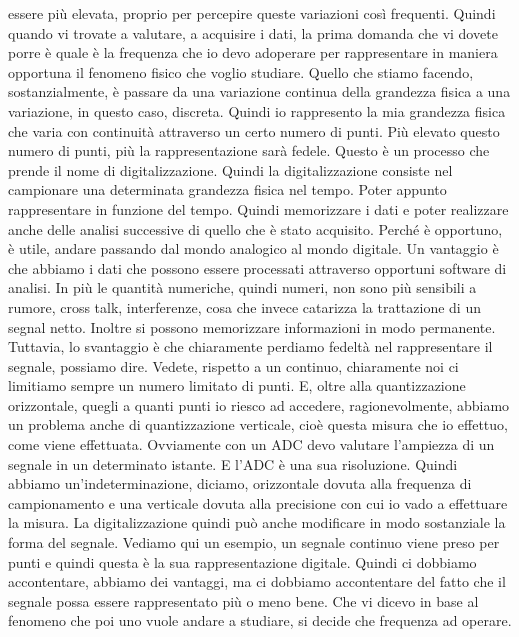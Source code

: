 essere più elevata, proprio per percepire queste variazioni così frequenti. Quindi quando vi trovate a valutare, a acquisire i dati, la prima domanda che vi dovete porre è quale è la frequenza che io devo adoperare per rappresentare in maniera opportuna il fenomeno fisico che voglio studiare. Quello che stiamo facendo, sostanzialmente, è passare da una variazione continua della grandezza fisica a una variazione, in questo caso, discreta. Quindi io rappresento la mia grandezza fisica che varia con continuità attraverso un certo numero di punti. Più elevato questo numero di punti, più la rappresentazione sarà fedele. Questo è un processo che prende il nome di digitalizzazione. Quindi la digitalizzazione consiste nel campionare una determinata grandezza fisica nel tempo. Poter appunto rappresentare in funzione del tempo. Quindi memorizzare i dati e poter realizzare anche delle analisi successive di quello che è stato acquisito. Perché è opportuno, è utile, andare passando dal mondo analogico al mondo digitale. Un vantaggio è che abbiamo i dati che possono essere processati attraverso opportuni software di analisi. In più le quantità numeriche, quindi numeri, non sono più sensibili a rumore, cross talk, interferenze, cosa che invece catarizza la trattazione di un segnal netto. Inoltre si possono memorizzare informazioni in modo permanente. Tuttavia, lo svantaggio è che chiaramente perdiamo fedeltà nel rappresentare il segnale, possiamo dire. Vedete, rispetto a un continuo, chiaramente noi ci limitiamo sempre un numero limitato di punti. E, oltre alla quantizzazione orizzontale, quegli a quanti punti io riesco ad accedere, ragionevolmente, abbiamo un problema anche di quantizzazione verticale, cioè questa misura che io effettuo, come viene effettuata. Ovviamente con un ADC devo valutare l'ampiezza di un segnale in un determinato istante. E l'ADC è una sua risoluzione. Quindi abbiamo un'indeterminazione, diciamo, orizzontale dovuta alla frequenza di campionamento e una verticale dovuta alla precisione con cui io vado a effettuare la misura. La digitalizzazione quindi può anche modificare in modo sostanziale la forma del segnale. Vediamo qui un esempio, un segnale continuo viene preso per punti e quindi questa è la sua rappresentazione digitale. Quindi ci dobbiamo accontentare, abbiamo dei vantaggi, ma ci dobbiamo accontentare del fatto che il segnale possa essere rappresentato più o meno bene. Che vi dicevo in base al fenomeno che poi uno vuole andare a studiare, si decide che frequenza ad operare. 

